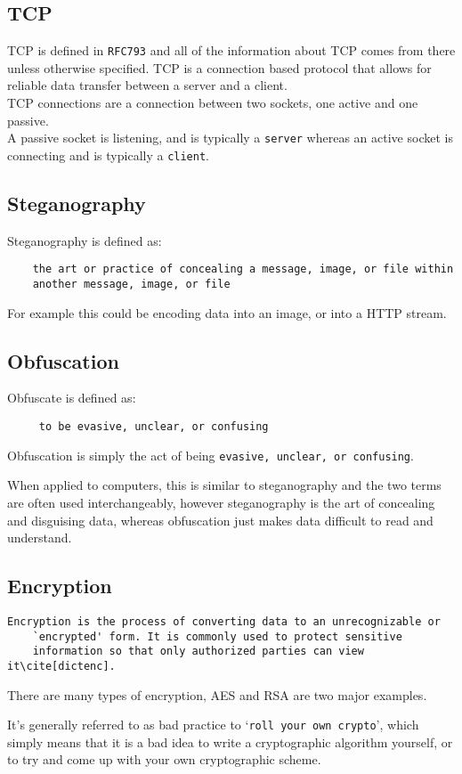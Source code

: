 \subsection{TCP}
TCP is defined in \texttt{RFC793}\cite{rfc793} and all of the information about TCP comes from there unless otherwise specified.
TCP is a connection based protocol that allows for reliable data transfer between a server and a client.\\
TCP connections are a connection between two sockets, one active and one passive.\\
A passive socket is listening, and is typically a \texttt{server} whereas an active socket is connecting and is typically a \texttt{client}.

\subsection{Steganography}
Steganography is defined as\cite{dictsteno}:
\begin{verbatim}
    the art or practice of concealing a message, image, or file within
    another message, image, or file
\end{verbatim}
For example this could be encoding data into an image, or into a HTTP stream.

\subsection{Obfuscation}
Obfuscate is defined as\cite{dictobfs}:
\begin{verbatim}
     to be evasive, unclear, or confusing
\end{verbatim}
Obfuscation is simply the act of being \texttt{evasive, unclear, or confusing}.\par
When applied to computers, this is similar to steganography and the two terms are often used interchangeably, however steganography is the art of concealing and disguising data, whereas obfuscation just makes data difficult to read and understand. 

\subsection{Encryption}
\begin{Verbatim}[commandchars=\\\[\]]
    Encryption is the process of converting data to an unrecognizable or
    `encrypted' form. It is commonly used to protect sensitive
    information so that only authorized parties can view it\cite[dictenc].
\end{Verbatim}
There are many types of encryption, AES and RSA are two major examples.\par
It's generally referred to as bad practice to `\texttt{roll your own crypto}'\cite{memtocrypto}, which simply means that it is a bad idea to write a cryptographic algorithm yourself, or to try and come up with your own cryptographic scheme.

